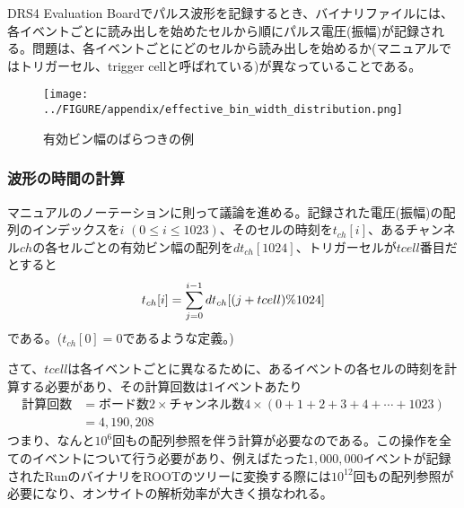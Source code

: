 \documentclass[../../main.tex]{subfiles}
\numberwithin{equation}{section}
\numberwithin{table}{section}
\numberwithin{figure}{section}
\begin{document}
      DRS4 Evaluation Boardでパルス波形を記録するとき、バイナリファイルには、各イベントごとに読み出しを始めたセルから順にパルス電圧(振幅)が記録される。問題は、各イベントごとにどのセルから読み出しを始めるか(マニュアル\cite{reparation:DRS4_manual}ではトリガーセル、trigger cellと呼ばれている)が異なっていることである。

      \begin{figure}[tbp]
        \centering
        \texttt{[image: ../FIGURE/appendix/effective\_bin\_width\_distribution.png]}
        \caption{有効ビン幅のばらつきの例}
        \label{fig:appendix_effective_bin_width_distribution}
      \end{figure}
    
    \subsubsection{波形の時間の計算}
      マニュアル\cite{reparation:DRS4_manual}のノーテーションに則って議論を進める。記録された電圧(振幅)の配列のインデックスを$i$ $(0\leq i \leq 1023)$、そのセルの時刻を$t_{ch}[i]$、あるチャンネル$ch$の各セルごとの有効ビン幅の配列を$dt_{ch}[1024]$、トリガーセルが$tcell$番目だとすると
      \begin{align}
        t_{ch}[i]=\sum_{j=0}^{i-1}dt_{ch}\qty[(j+tcell)\%1024]\label{eq:appendix_t_ch}
      \end{align}
      である。($t_{ch}[0]=0$であるような定義。)

      さて、$tcell$は各イベントごとに異なるために、あるイベントの各セルの時刻を計算する必要があり、その計算回数は1イベントあたり
      \begin{align}
        \text{計算回数}&=\text{ボード数2}\times\text{チャンネル数4}\times(0+1+2+3+4+\cdots +1023)\\
        &=4,190,208
      \end{align}
      つまり、なんと$10^6$回もの配列参照を伴う計算が必要なのである。この操作を全てのイベントについて行う必要があり、例えばたった$1,000,000$イベントが記録されたRunのバイナリをROOTのツリーに変換する際には$10^{12}$回もの配列参照が必要になり、オンサイトの解析効率が大きく損なわれる。
\end{document}
